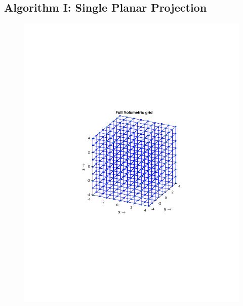 \documentclass{UCF_ETD}
\begin{document}
\subsection{Algorithm I: Single Planar Projection}
\begin{figure}[H]   
\begin{center}
\includegraphics[scale=0.5]{FVR/FullVolume}

\end{center}
\end{figure}
\end{document}
